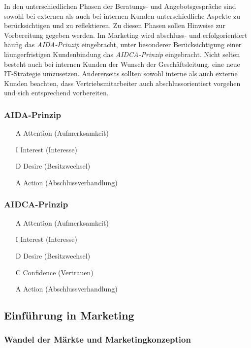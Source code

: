 \documentclass[a4paper, 12pt]{report}
\begin{document}
In den unterschiedlichen Phasen der Beratungs- und Angebotsgespräche sind sowohl 
bei externen als auch bei internen Kunden unterschiedliche Aspekte zu 
berücksichtigen und zu reflektieren. Zu diesen Phasen sollen Hinweise zur 
Vorbereitung gegeben werden. Im Marketing wird abschluss- und erfolgorientiert 
häufig das \emph{AIDA-Prinzip} eingebracht, unter besonderer Berücksichtigung 
einer läungerfristigen Kundenbindung das \emph{AIDCA-Prinzip} eingebracht. Nicht
selten besteht auch bei internen Kunden der Wunsch der Geschäftsleitung, eine 
neue IT-Strategie umzusetzen. Andererseits sollten sowohl interne als auch 
externe Kunden beachten, dass Vertriebsmitarbeiter auch abschlussorientiert 
vorgehen und sich entsprechend vorbereiten. \\

\subsubsection{AIDA-Prinzip}

\begin{itemize}
    \item[A] Attention (Aufmerksamkeit)
    \item[I] Interest (Interesse)
    \item[D] Desire (Besitzwechsel)
    \item[A] Action (Abschlussverhandlung)
\end{itemize}

\subsubsection{AIDCA-Prinzip}

\begin{itemize}
    \item[A] Attention (Aufmerksamkeit)
    \item[I] Interest (Interesse)
    \item[D] Desire (Besitzwechsel)
    \item[C] Confidence (Vertrauen)
    \item[A] Action (Abschlussverhandlung)
\end{itemize}

\subsection{Einführung in Marketing}

\subsubsection{Wandel der Märkte und Marketingkonzeption}
\end{document}
